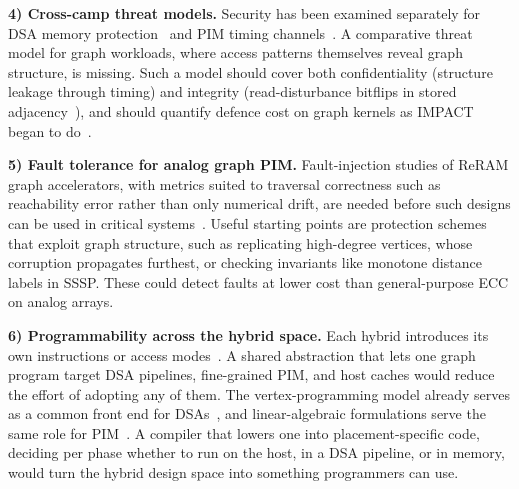 \documentclass[journal,onecolumn]{IEEEtran}
\begin{document}
\textbf{4) Cross-camp threat models.} Security has been examined separately for DSA memory protection~\cite{hua2022mgx} and PIM timing channels~\cite{bostanci2025impact}. A comparative threat model for graph workloads, where access patterns themselves reveal graph structure, is missing. Such a model should cover both confidentiality (structure leakage through timing) and integrity (read-disturbance bitflips in stored adjacency~\cite{yuksel2026pid}), and should quantify defence cost on graph kernels as IMPACT began to do~\cite{bostanci2025impact}.

\textbf{5) Fault tolerance for analog graph PIM.} Fault-injection studies of ReRAM graph accelerators, with metrics suited to traversal correctness such as reachability error rather than only numerical drift, are needed before such designs can be used in critical systems~\cite{song2018graphr,zheng2020spara}. Useful starting points are protection schemes that exploit graph structure, such as replicating high-degree vertices, whose corruption propagates furthest, or checking invariants like monotone distance labels in SSSP. These could detect faults at lower cost than general-purpose ECC on analog arrays.

\textbf{6) Programmability across the hybrid space.} Each hybrid introduces its own instructions or access modes~\cite{shin2025piccolo,shin2025fala,yenimol2026cograf}. A shared abstraction that lets one graph program target DSA pipelines, fine-grained PIM, and host caches would reduce the effort of adopting any of them. The vertex-programming model already serves as a common front end for DSAs~\cite{ham2016graphicionado}, and linear-algebraic formulations serve the same role for PIM~\cite{barkhordar2025alphapim}. A compiler that lowers one into placement-specific code, deciding per phase whether to run on the host, in a DSA pipeline, or in memory, would turn the hybrid design space into something programmers can use.

\end{document}
